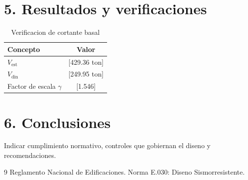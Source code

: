 \documentclass[paper=a4,fontsize=10pt]{scrartcl}
\begin{document}
\section*{5. Resultados y verificaciones}
\begin{table}[H]
\centering
\caption{Verificacion de cortante basal}
\begin{tabular}{lc}
\toprule
Concepto & Valor \\
\midrule
$V_{\text{est}}$ & [429.36 ton] \\
$V_{\text{din}}$ & [249.95 ton] \\
Factor de escala $\gamma$ & [1.546] \\
\bottomrule
\end{tabular}
\end{table}

\section*{6. Conclusiones}
Indicar cumplimiento normativo, controles que gobiernan el diseno y recomendaciones.

\begin{thebibliography}{9}
Reglamento Nacional de Edificaciones. Norma E.030: Diseno Sismorresistente.
\end{thebibliography}
\end{document}
